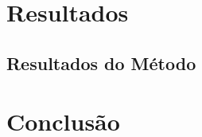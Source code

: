 \documentclass[
	12pt,				%
	openright,			%
	oneside,			%
	a4paper,			%
	english,			%
	french,				%
	spanish,			%
	brazil,				%
	]{abntex2}
\begin{document}

\chapter{Resultados}
\label{ch: resultados} 


\section{Resultados do Método}
\label{sec: resultados}



 \chapter{Conclusão}
 \label{ch: conclusao}
 



% 

\postextual




%
%

\end{document}
